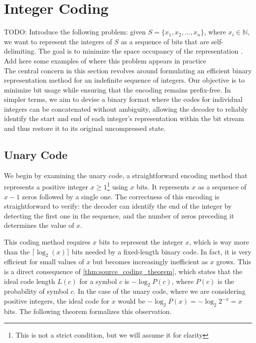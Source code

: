\clearpage
\section{Integer Coding} \label{sec:integer_coding}

\noindent TODO: Introduce the following problem: given $S=\{x_1,x_2,\ldots,x_n\}$, where $x_i\in\mathbb{N}$, we want to represent the integers of $S$ as a sequence of bits that are self-delimiting. The goal is to minimize the space occupancy of the representation \cite{ferragina2023pearls}. Add here some examples of where this problem appears in practice \cite{witten1999managing} \\

\noindent The central concern in this section revolves around formulating an efficient binary representation method for an indefinite sequence of integers. Our objective is to minimize bit usage while ensuring that the encoding remains prefix-free. In simpler terms, we aim to devise a binary format where the codes for individual integers can be concatenated without ambiguity, allowing the decoder to reliably identify the start and end of each integer's representation within the bit stream and thus restore it to its original uncompressed state.

\subsection{Unary Code}
We begin by examining the unary code, a straightforward encoding method that represents a positive integer $x \geq 1$\footnote{This is not a strict condition, but we will assume it for clarity} using $x$ bits. It represents $x$ as a sequence of $x-1$ zeros followed by a single one. The correctness of this encoding is straightforward to verify: the decoder can identify the end of the integer by detecting the first one in the sequence, and the number of zeros preceding it determines the value of $x$. \vspace{0.4cm}

\noindent This coding method requires $x$ bits to represent the integer $x$, which is way more than the $\lceil\log_2(x)\rceil$ bits needed by a fixed-length binary code. In fact, it is very efficient for small values of $x$ but becomes increasingly inefficient as $x$ grows. This is a direct consequence of \autoref{thm:source_coding_theorem}, which states that the ideal code length $L(c)$ for a symbol $c$ is $-\log_2 P(c)$, where $P(c)$ is the probability of symbol $c$. In the case of the unary code, where we are considering positive integers, the ideal code for $x$ would be $-\log_2 P(x) = -\log_2 2^{-x} = x$ bits. The following theorem formalizes this observation. \cite{ferragina2023pearls}

